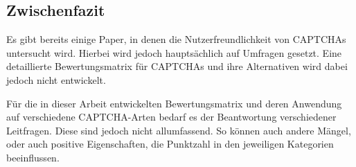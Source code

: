 \subsection*{Zwischenfazit}
Es gibt bereits einige Paper, in denen die Nutzerfreundlichkeit von CAPTCHAs untersucht wird.
Hierbei wird jedoch hauptsächlich auf Umfragen gesetzt. 
Eine detaillierte Bewertungsmatrix für CAPTCHAs und ihre Alternativen wird dabei jedoch nicht entwickelt. 

Für die in dieser Arbeit entwickelten Bewertungsmatrix und deren Anwendung auf verschiedene CAPTCHA-Arten bedarf es der Beantwortung verschiedener Leitfragen.
Diese sind jedoch nicht allumfassend. 
So können auch andere Mängel, oder auch positive Eigenschaften, die Punktzahl in den jeweiligen Kategorien beeinflussen.



